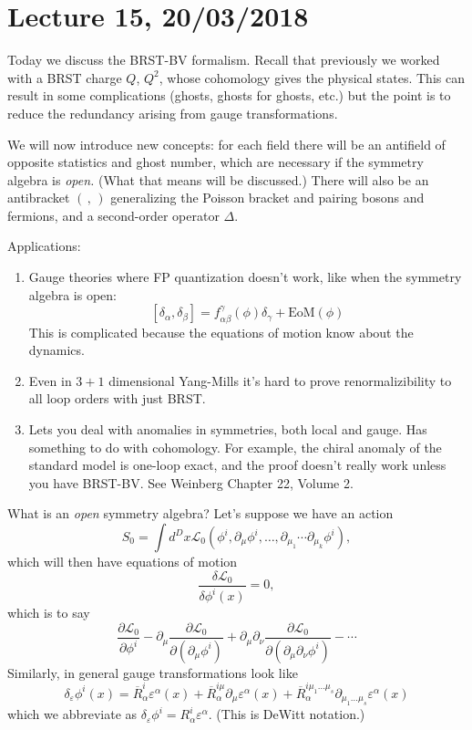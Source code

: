 \section*{Lecture 15, 20/03/2018}
Today we discuss the BRST-BV formalism.
Recall that previously we worked with a BRST charge $Q$, $Q^2$, whose cohomology gives the physical states.
This can result in some complications (ghosts, ghosts for ghosts, etc.) but the point is to reduce the redundancy arising from gauge transformations.

We will now introduce new concepts: for each field there will be an antifield of opposite statistics and ghost number, which are necessary if the symmetry algebra is \emph{open.} (What that means will be discussed.)
There will also be an antibracket $(\,,\,)$ generalizing the Poisson bracket and pairing bosons and fermions, and a second-order operator $\Delta$.

Applications:
\begin{enumerate}
    \item Gauge theories where FP quantization doesn't work, like when the symmetry algebra is open:
    \[
    [\delta_\alpha, \delta_\beta] = f_{\alpha \beta}^\gamma(\phi) \delta_\gamma + \text{EoM}(\phi)
    \]
    This is complicated because the equations of motion know about the dynamics.
    \item Even in $3+1$ dimensional Yang-Mills it's hard to prove renormalizibility to all loop orders with just BRST.
    \item Lets you deal with anomalies in symmetries, both local and gauge.
    Has something to do with cohomology.
    For example, the chiral anomaly of the standard model is one-loop exact, and the proof doesn't really work unless you have BRST-BV. See Weinberg Chapter 22, Volume 2.
\end{enumerate}

What is an \emph{open} symmetry algebra?
Let's suppose we have an action
\[
S_0 = \int d^D x \mathcal{L}_0 (\phi^i, \partial_\mu \phi^i, \dots, \partial_{\mu_1} \cdots \partial_{\mu_k} \phi^i),
\]
which will then have equations of motion
\[
\frac{\delta \mathcal{L}_0}{\delta \phi^i(x)} = 0,
\]
which is to say
\[
\frac{\partial \mathcal{L}_0}{\partial \phi^i} - \partial_\mu \frac{\partial \mathcal{L}_0}{\partial (\partial_\mu\phi^i)} +  \partial_\mu  \partial_\nu \frac{\partial \mathcal{L}_0}{\partial (\partial_\mu \partial_\nu \phi^i)} - \cdots
\]
Similarly, in general gauge transformations look like
\[
\delta_\varepsilon \phi^i(x) = \overline{R}_\alpha^i \varepsilon^\alpha(x) + \overline{R}_\alpha^{i \mu} \partial_\mu \varepsilon^\alpha(x) + \overline{R}_\alpha^{i \mu_1 \dots \mu_s} \partial_{\mu_1 \dots \mu_s} \varepsilon^\alpha(x)
\]
which we abbreviate as $\delta_{\varepsilon}\phi^i = R_\alpha^i \varepsilon^\alpha$. 
(This is DeWitt notation.)

